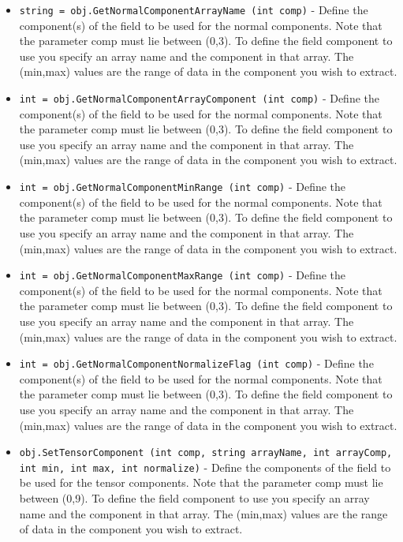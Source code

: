 \begin{itemize}
\item  \verb|string = obj.GetNormalComponentArrayName (int comp)| -  Define the component(s) of the field to be used for the normal
 components.  Note that the parameter comp must lie between (0,3). To
 define the field component to use you specify an array name and the
 component in that array. The (min,max) values are the range of data in
 the component you wish to extract.

\item  \verb|int = obj.GetNormalComponentArrayComponent (int comp)| -  Define the component(s) of the field to be used for the normal
 components.  Note that the parameter comp must lie between (0,3). To
 define the field component to use you specify an array name and the
 component in that array. The (min,max) values are the range of data in
 the component you wish to extract.

\item  \verb|int = obj.GetNormalComponentMinRange (int comp)| -  Define the component(s) of the field to be used for the normal
 components.  Note that the parameter comp must lie between (0,3). To
 define the field component to use you specify an array name and the
 component in that array. The (min,max) values are the range of data in
 the component you wish to extract.

\item  \verb|int = obj.GetNormalComponentMaxRange (int comp)| -  Define the component(s) of the field to be used for the normal
 components.  Note that the parameter comp must lie between (0,3). To
 define the field component to use you specify an array name and the
 component in that array. The (min,max) values are the range of data in
 the component you wish to extract.

\item  \verb|int = obj.GetNormalComponentNormalizeFlag (int comp)| -  Define the component(s) of the field to be used for the normal
 components.  Note that the parameter comp must lie between (0,3). To
 define the field component to use you specify an array name and the
 component in that array. The (min,max) values are the range of data in
 the component you wish to extract.

\item  \verb|obj.SetTensorComponent (int comp, string arrayName, int arrayComp, int min, int max, int normalize)| -  Define the components of the field to be used for the tensor
 components.  Note that the parameter comp must lie between (0,9). To
 define the field component to use you specify an array name and the
 component in that array. The (min,max) values are the range of data in
 the component you wish to extract.


\end{itemize}
